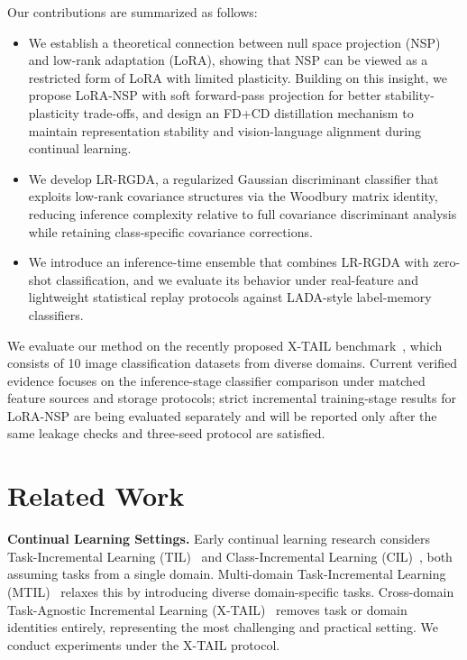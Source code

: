 \documentclass{article}
\begin{document}
Our contributions are summarized as follows:
\begin{itemize}
    \item We establish a theoretical connection between null space projection (NSP) and low-rank adaptation (LoRA), showing that NSP can be viewed as a restricted form of LoRA with limited plasticity. Building on this insight, we propose LoRA-NSP with soft forward-pass projection for better stability-plasticity trade-offs, and design an FD+CD distillation mechanism to maintain representation stability and vision-language alignment during continual learning.
    \item We develop LR-RGDA, a regularized Gaussian discriminant classifier that exploits low-rank covariance structures via the Woodbury matrix identity, reducing inference complexity relative to full covariance discriminant analysis while retaining class-specific covariance corrections.
    \item We introduce an inference-time ensemble that combines LR-RGDA with zero-shot classification, and we evaluate its behavior under real-feature and lightweight statistical replay protocols against LADA-style label-memory classifiers.
\end{itemize}

We evaluate our method on the recently proposed X-TAIL benchmark~\cite{xu2024rail}, which consists of 10 image classification datasets from diverse domains. Current verified evidence focuses on the inference-stage classifier comparison under matched feature sources and storage protocols; strict incremental training-stage results for LoRA-NSP are being evaluated separately and will be reported only after the same leakage checks and three-seed protocol are satisfied.

\section{Related Work}
\label{sec:related}

\textbf{Continual Learning Settings.}
Early continual learning research considers Task-Incremental Learning (TIL)~\cite{hsu2018re} and Class-Incremental Learning (CIL)~\cite{rebuffi2017icarl}, both assuming tasks from a single domain. Multi-domain Task-Incremental Learning (MTIL)~\cite{zheng2023zscl} relaxes this by introducing diverse domain-specific tasks. Cross-domain Task-Agnostic Incremental Learning (X-TAIL)~\cite{xu2024rail} removes task or domain identities entirely, representing the most challenging and practical setting. We conduct experiments under the X-TAIL protocol.
\end{document}
